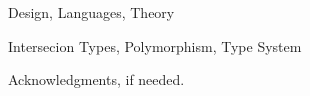 \documentclass[times,10pt]{sigplanconf}
\begin{document}

\terms
Design, Languages, Theory

\keywords
Intersecion Types, Polymorphism, Type System












\appendix



\acks

Acknowledgments, if needed.
\end{document}
